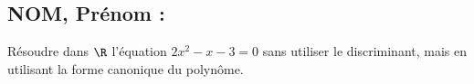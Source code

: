 \documentclass[a4paper,11pt,exos]{nsi}
\begin{document}
\subsection*{NOM, Prénom : \dotfill} 


\maketitle




\begin{exercice}%
    Résoudre dans $\R$ l'équation $2x^2-x-3=0$ sans utiliser le discriminant, mais en utilisant la forme canonique du polynôme.
    
\end{exercice}

\end{document}
